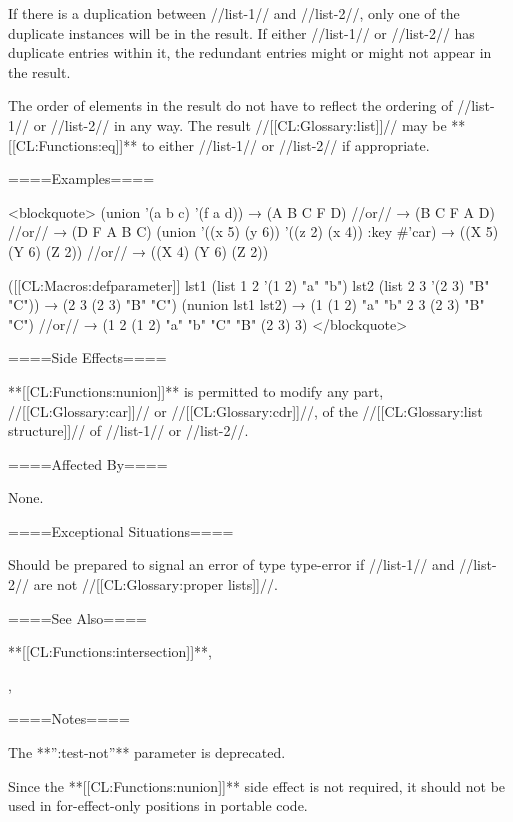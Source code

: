 If there is a duplication between //list-1// and //list-2//, only one of the duplicate instances will be in the result. If either //list-1// or //list-2// has duplicate entries within it, the redundant entries might or might not appear in the result.

The order of elements in the result do not have to reflect the ordering of //list-1// or //list-2// in any way. The result //[[CL:Glossary:list]]// may be **[[CL:Functions:eq]]** to either //list-1// or //list-2// if appropriate.

====Examples====

<blockquote> (union '(a b c) '(f a d)) → (A B C F D) //or// → (B C F A D) //or// → (D F A B C) (union '((x 5) (y 6)) '((z 2) (x 4)) :key #'car) → ((X 5) (Y 6) (Z 2)) //or// → ((X 4) (Y 6) (Z 2))

([[CL:Macros:defparameter]] lst1 (list 1 2 '(1 2) "a" "b") lst2 (list 2 3 '(2 3) "B" "C")) → (2 3 (2 3) "B" "C") (nunion lst1 lst2) → (1 (1 2) "a" "b" 2 3 (2 3) "B" "C") //or// → (1 2 (1 2) "a" "b" "C" "B" (2 3) 3) </blockquote>

====Side Effects====

**[[CL:Functions:nunion]]** is permitted to modify any part, //[[CL:Glossary:car]]// or //[[CL:Glossary:cdr]]//, of the //[[CL:Glossary:list structure]]// of //list-1// or //list-2//.

====Affected By====

None.

====Exceptional Situations====

Should be prepared to signal an error of type type-error if //list-1// and //list-2// are not //[[CL:Glossary:proper lists]]//.

====See Also====

**[[CL:Functions:intersection]]**,

{\secref\ConstantModification},

{\secref\TraversalRules}

====Notes====

The **'':test-not''** parameter is deprecated.

Since the **[[CL:Functions:nunion]]** side effect is not required, it should not be used in for-effect-only positions in portable code.

   

